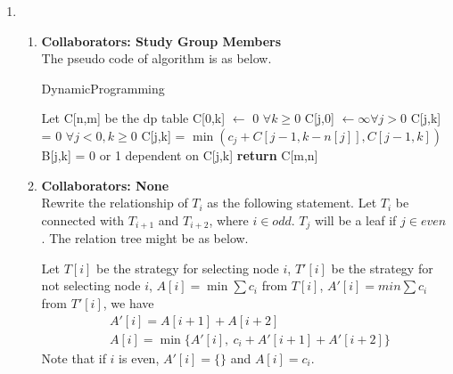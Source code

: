 \documentclass[a4paper,12pt]{article}
\begin{document}
\begin{enumerate}
\item{ 
\begin{enumerate}
    \item { \textbf{Collaborators: Study Group Members} \\ The pseudo code of algorithm is as below.
\begin{algorithm}
	\caption{DynamicProgramming} 
	\begin{algorithmic}[1]
	    \State Let C[n,m] be the dp table
	    \State C[0,k] $\gets$ 0 $\forall k \geq 0$
	    \State C[j,0] $\gets \infty \forall j > 0$
	    \State C[j,k] = 0 $\forall j < 0, k \geq 0$
	            \State C[j,k] = $\min (c_j + C[j-1, k-n[j]], C[j-1,k])$
	            \State B[j,k] = 0 or 1 dependent on C[j,k]
	        \EndFor
	    \EndFor
	    \State \textbf{return} C[m,n]
	\end{algorithmic} 
\end{algorithm}
    } %
    \item { \textbf{Collaborators: None} \\
Rewrite the relationship of $T_i$ as the following statement. Let $T_i$ be connected with $T_{i+1}$ and $T_{i+2}$, where $i \in odd$. $T_j$ will be a leaf if $j \in even$. The relation tree might be as below. \\
\begin{center}
\end{center}
Let $T[i]$ be the strategy for selecting node $i$, $T'[i]$ be the strategy for not selecting node $i$, $A[i] = \min \sum c_i$ from $T[i]$, $A'[i] = min \sum c_i$ from $T'[i]$, we have
\[
\begin{split}
    & A'[i] = A[i+1] + A[i+2] \\
    & A[i] = \min \{ A'[i], \ c_i + A'[i+1] + A'[i+2] \}
\end{split}
\]
Note that if $i$ is even, $A'[i] = \{ \}$ and $A[i] = c_i$.

}
\end{enumerate}}
\end{enumerate}
\end{document}

